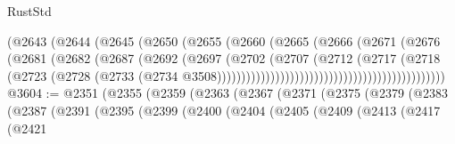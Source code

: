\begin{lexlean}{RustStd}
\begin{coremodule}
                                                  (@2643
                                                    (@2644
                                                      (@2645
                                                        (@2650
                                                          (@2655
                                                            (@2660
                                                              (@2665
                                                                (@2666
                                                                  (@2671
                                                                    (@2676
                                                                      (@2681
                                                                        (@2682
                                                                          (@2687
                                                                            (@2692
                                                                              (@2697
                                                                                (@2702
                                                                                  (@2707
                                                                                    (@2712
                                                                                      (@2717
                                                                                        (@2718
                                                                                          (@2723
                                                                                            (@2728
                                                                                              (@2733
                                                                                                (@2734
                                                                                                  @3508)))))))))))))))))))))))))))))))))))))))))))))))
@3604 := @2351
    (@2355
      (@2359
        (@2363
          (@2367
            (@2371
              (@2375
                (@2379
                  (@2383
                    (@2387
                      (@2391
                        (@2395
                          (@2399
                            (@2400
                              (@2404
                                (@2405
                                  (@2409
                                    (@2413
                                      (@2417
                                        (@2421

\end{coremodule}
\end{lexlean}
